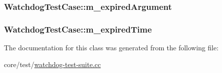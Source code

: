 \subsubsection[{\texorpdfstring{m\+\_\+expired\+Argument}{m_expiredArgument}}]{ Watchdog\+Test\+Case\+::m\+\_\+expired\+Argument}\hypertarget{classWatchdogTestCase_a4547198b5406633de3fc3bf1761359f4}{}\label{classWatchdogTestCase_a4547198b5406633de3fc3bf1761359f4}
\subsubsection[{\texorpdfstring{m\+\_\+expired\+Time}{m_expiredTime}}]{ Watchdog\+Test\+Case\+::m\+\_\+expired\+Time}\hypertarget{classWatchdogTestCase_aa0f2805ce13495f45652eb98ce374f9c}{}\label{classWatchdogTestCase_aa0f2805ce13495f45652eb98ce374f9c}


The documentation for this class was generated from the following file\+:\begin{DoxyCompactItemize}
\item 
core/test/\hyperlink{watchdog-test-suite_8cc}{watchdog-\/test-\/suite.\+cc}\end{DoxyCompactItemize}
